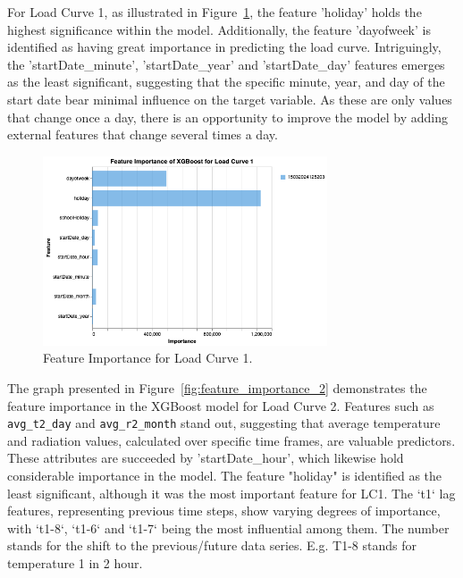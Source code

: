 \documentclass{article} %
\begin{document}
For Load Curve 1, as illustrated in Figure~\ref{fig:feature_importance_1}, the feature 'holiday' holds the highest significance within the model. Additionally, the feature 'dayofweek' is identified as having great importance in predicting the load curve. Intriguingly, the 'startDate\_minute', 'startDate\_year' and 'startDate\_day' features emerges as the least significant, suggesting that the specific minute, year, and day of the start date bear minimal influence on the target variable. As these are only values that change once a day, there is an opportunity to improve the model by adding external features that change several times a day.
\begin{figure}[H]
    \centering
    \includegraphics[width=0.75\textwidth]{ressources/FeatureImportance/Feature Importance 1.png}
    \caption{Feature Importance for Load Curve 1.}
    \label{fig:feature_importance_1}
\end{figure}
The graph presented in Figure~\ref{fig:feature_importance_2} demonstrates the feature importance in the XGBoost model for Load Curve 2. Features such as \texttt{avg\_t2\_day} and \texttt{avg\_r2\_month} stand out, suggesting that average temperature and radiation values, calculated over specific time frames, are valuable predictors. These attributes are succeeded by 'startDate\_hour', which likewise hold considerable importance in the model. The feature "holiday" is identified as the least significant, although it was the most important feature for LC1. The ‘t1‘ lag features, representing previous time steps,
show varying degrees of importance, with ‘t1-8‘, ‘t1-6‘ and ‘t1-7‘ being the most influential among them. The number stands for the shift to the previous/future data series. E.g. T1-8 stands for temperature 1 in 2 hour.
\end{document}
